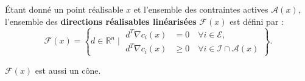 \begin{definition}
    Étant donné un point réalisable $x$ et l'ensemble des contraintes actives $\mathcal{A}(x)$, l'ensemble des \textbf{directions réalisables linéarisées} $\mathcal{F}(x)$ est défini par :
    \begin{equation}
        \mathcal{F}(x) = \left\{ d \in \mathbb{R}^n \mid 
        \begin{aligned}
            d^T \nabla c_i(x) &= 0 \quad \forall i \in \mathcal{E}, \\
            d^T \nabla c_i(x) &\ge 0 \quad \forall i \in \mathcal{I} \cap \mathcal{A}(x)
        \end{aligned}
        \right\}.
    \end{equation}
\end{definition}

\begin{remarque}
    $\mathcal{F}(x)$ est aussi un cône.
\end{remarque}

